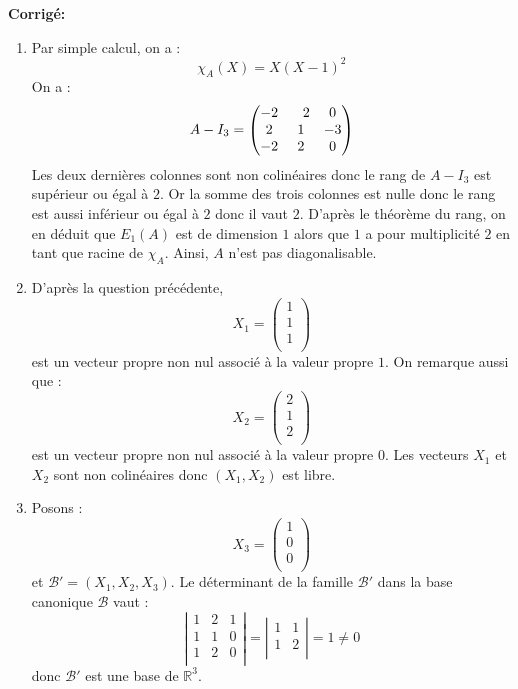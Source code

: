 \documentclass[a4paper,twoside,french,10pt]{VcCours}
\newcommand{\corr}{\textbf{Corrigé:}}
\begin{document}
\corr

\begin{enumerate}
\item Par simple calcul, on a :
$$ \chi_A(X)=X(X-1)^2$$
On a :
$$ A-I_3 = \begin{pmatrix} -2 &\phantom-2 & 0 \cr 2 &1 &-3 \cr -2 &2 &0 \cr \end{pmatrix}$$
Les deux dernières colonnes sont non colinéaires donc le rang de $A-I_3$ est supérieur ou égal à $2$. Or la somme des trois colonnes est nulle donc le rang est aussi inférieur ou égal à $2$ donc il vaut $2$. D'après le théorème du rang, on en déduit que $E_1(A)$ est de dimension $1$ alors que $1$ a pour multiplicité $2$ en tant que racine de $\chi_A$. Ainsi, $A$ n'est pas diagonalisable.
\item D'après la question précédente, 
$$ X_1 = \begin{pmatrix}
1 \\
1 \\
1 \\
\end{pmatrix}$$ 
est un vecteur propre non nul associé à la valeur propre $1$.
On remarque aussi que :
$$ X_2 = \begin{pmatrix}
2 \\
1 \\
2 \\
\end{pmatrix}$$ 
est un vecteur propre non nul associé à la valeur propre $0$. Les vecteurs $X_1$ et $X_2$ sont non colinéaires donc $(X_1,X_2)$ est libre.
\item Posons :
$$ X_3 = \begin{pmatrix}
1 \\
0 \\
0  \\
\end{pmatrix}$$
et $\mathcal{B}'=(X_1,X_2,X_3)$. Le déterminant de la famille $\mathcal{B}'$ dans la base canonique $\mathcal{B}$ vaut :
$$ \left\vert \begin{array}{ccc}
1 & 2 & 1 \\
1 & 1 & 0 \\
1 & 2 & 0 \\
\end{array}\right\vert = \left\vert \begin{array}{cc}
1 & 1 \\
1 & 2 \\
\end{array}\right\vert =  1 \neq 0$$
donc $\mathcal{B}'$ est une base de $\mathbb{R}^3$.

\end{enumerate}
\end{document}
